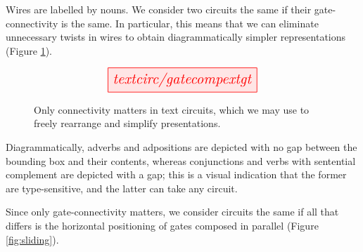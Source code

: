 
\begin{convention}\label{conv:twist}
Wires are labelled by nouns. We consider two circuits the same if their gate-connectivity is the same. In particular, this means that we can eliminate unnecessary twists in wires to obtain diagrammatically simpler representations (Figure \ref{fig:twistsimple}).
\end{convention}

\begin{figure}[h!]\label{fig:twistsimple}
\centering
\[
\resizebox{0.5\textwidth}{!}{\tikzfig{textcirc/gatecompextgt}}
\]
\caption{
Only connectivity matters in text circuits, which we may use to freely rearrange and simplify presentations.}
\end{figure}

\begin{convention}\label{conv:gaps}
Diagrammatically, adverbs and adpositions are depicted with no gap between the bounding box and their contents, whereas conjunctions and verbs with sentential complement are depicted with a gap; this is a visual indication that the former are type-sensitive, and the latter can take any circuit.
\end{convention}

\begin{convention}[Sliding]\label{conv:sliding}
Since only gate-connectivity matters, we consider circuits the same if all that differs is the horizontal positioning of gates composed in parallel (Figure \ref{fig:sliding}).
\end{convention}

